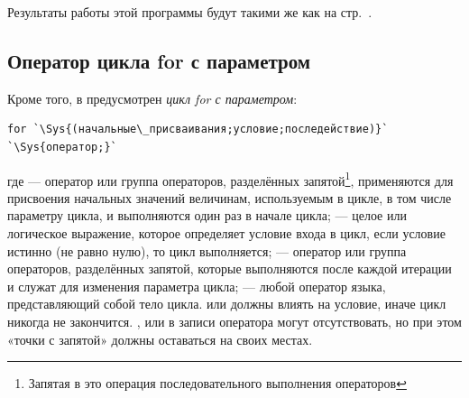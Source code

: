Результаты работы этой программы будут такими же как на стр.~\pageref{ch03:out0}.%

\subsection[Оператор цикла for с параметром]{Оператор цикла for с параметром}
Кроме того, в  предусмотрен \emph{цикл for с параметром}:
\begin{lstlisting}
for `\Sys{(начальные\_присваивания;условие;последействие)}`
`\Sys{оператор;}`
\end{lstlisting}
где  --- оператор или группа операторов, разделённых
запятой\footnote{Запятая в  это операция последовательного выполнения операторов}, применяются для присвоения
начальных значений величинам, используемым в цикле, в том числе параметру цикла, и выполняются один раз в начале цикла;
 --- целое или логическое выражение, которое определяет условие входа в цикл, если условие истинно (не равно
нулю), то цикл выполняется;  --- оператор или группа операторов, разделённых запятой,
которые выполняются после каждой итерации и служат для изменения параметра цикла;  --- любой
оператор языка, представляющий собой тело цикла.  или 
должны влиять на условие, иначе цикл никогда не закончится. ,
 или  в записи оператора  могут
отсутствовать, но при этом «точки с запятой» должны оставаться на своих местах.

